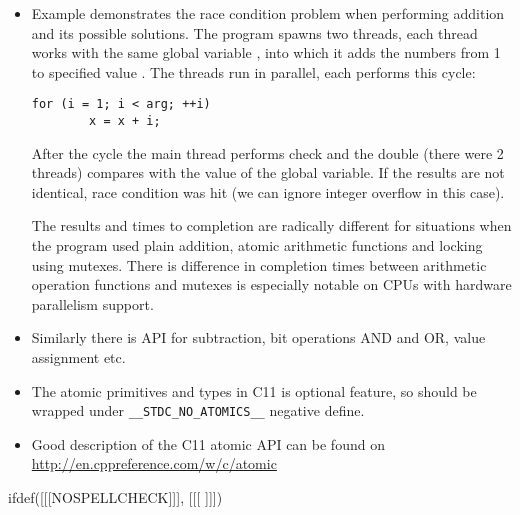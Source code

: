 \begin{itemize}
\item \label{ATOMIC_ADD} Example  demonstrates
the race condition problem when performing addition and its possible solutions.
The program spawns two threads, each thread works with the same global variable
, into which it adds the numbers from 1 to specified value
.
The threads run in parallel, each performs this cycle:

\begin{verbatim}
for (i = 1; i < arg; ++i)
        x = x + i;
\end{verbatim}

After the cycle the main thread performs check and the double (there were
2 threads) compares with the value of the  global variable.
If the results are not identical, race condition was hit (we can ignore
integer overflow in this case).
\par
The results and times to completion are radically different for situations
when the program used plain addition, atomic arithmetic functions and locking
using mutexes. There is difference in completion times between 
arithmetic operation functions and mutexes is especially notable on
CPUs with hardware parallelism support.
\item Similarly there is API for subtraction, bit operations
AND and OR, value assignment etc.
\item The atomic primitives and types in C11 is optional feature, so should
be wrapped under \texttt{\_\_STDC\_NO\_ATOMICS\_\_} negative define.
\item Good description of the C11 atomic API can be found on
\url{http://en.cppreference.com/w/c/atomic}
\end{itemize}



ifdef([[[NOSPELLCHECK]]], [[[
]]])

